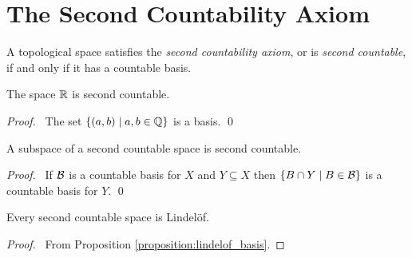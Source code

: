 \section{The Second Countability Axiom}

\begin{definition}
    A topological space satisfies the \emph{second countability axiom},
    or is \emph{second countable}, if and only if it has a countable basis.    
\end{definition}

\begin{example}
    The space $\mathbb{R}$ is second countable.

    \begin{proof}
    \pf\ The set $\{ (a,b) \mid a,b \in \mathbb{Q} \}$ is a basis. \qed
\end{proof}
\end{example}

\begin{proposition}
    \label{proposition:second_countable_subspace}
    A subspace of a second countable space is second countable.
\end{proposition}

\begin{proof}
    \pf\ If $\mathcal{B}$ is a countable basis for $X$ and $Y \subseteq X$
    then $\{ B \cap Y \mid B \in \mathcal{B} \}$ is a countable basis for $Y$. \qed
\end{proof}

\begin{proposition}[CC]
    \label{proposition:lindelof_second_countable}
    Every second countable space is Lindel\"{o}f.
\end{proposition}

\begin{proof}
    \pf\ From Proposition \ref{proposition:lindelof_basis}.
\end{proof}


